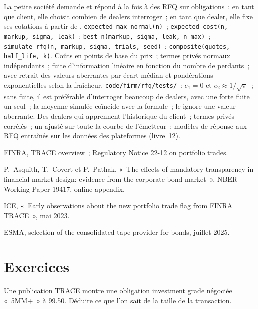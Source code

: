 \begin{build}
 La petite société demande et répond à la fois à des RFQ sur obligations~: en
tant que client, elle choisit combien de dealers interroger~; en tant que dealer, elle fixe ses cotations à partir de .
 \texttt{expected\_max\_normal(n)}~; \texttt{expected\_cost(n, markup,
sigma, leak)}~; \texttt{best\_n(markup, sigma, leak, n\_max)}~;
\texttt{simulate\_rfq(n, markup, sigma, trials, seed)}~; \texttt{composite(quotes,
half\_life, k)}.
 Coûts en points de base du prix~; termes privés normaux indépendants~;
fuite d'information linéaire en fonction du nombre de perdants~;  avec retrait des valeurs
aberrantes par écart médian et pondérations exponentielles selon la fraîcheur.
 \texttt{code/firm/rfq/tests/}~: $e_1 = 0$ et $e_2 \approx
1/\sqrt\pi$~; sans fuite, il est préférable d'interroger beaucoup de dealers, avec une forte fuite un seul~; la moyenne simulée
coïncide avec la formule~; le  ignore une valeur aberrante.
 Des dealers qui apprennent l'historique du client~; termes privés corrélés~;
un  ajusté sur toute la courbe de l'émetteur~; modèles de réponse aux RFQ entraînés sur
les données des plateformes (livre~12).
\end{build}

\begin{omsources}
\item FINRA, TRACE overview~; Regulatory Notice 22-12 on portfolio trades.
\item P.~Asquith, T.~Covert et P.~Pathak, «~The effects of mandatory transparency in
financial market design: evidence from the corporate bond market~», NBER Working
Paper 19417, online appendix.
\item ICE, «~Early observations about the new portfolio trade flag from FINRA TRACE~»,
mai 2023.
\item ESMA, selection of the consolidated tape provider for bonds, juillet 2025.
\end{omsources}

\section{Exercices}

\begin{exercise}[$\star$]\label{exo:m2:how-bonds-trade:1}
Une publication TRACE montre une obligation investment grade négociée «~5MM$+$~» à 99.50.
Déduire ce que l'on sait de la taille de la transaction.
\end{exercise}

